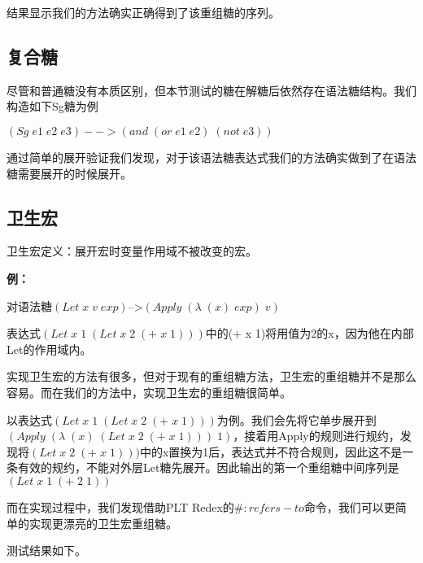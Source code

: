 结果显示我们的方法确实正确得到了该重组糖的序列。

\subsection{复合糖}

尽管和普通糖没有本质区别，但本节测试的糖在解糖后依然存在语法糖结构。我们构造如下Sg糖为例

$(Sg\;e1\;e2\;e3)-->(and\;(or\;e1\;e2)\;(not\;e3))$


通过简单的展开验证我们发现，对于该语法糖表达式我们的方法确实做到了在语法糖需要展开的时候展开。

\subsection{卫生宏}

卫生宏定义：展开宏时变量作用域不被改变的宏。

{\bfseries 例：}

对语法糖$(Let\;x\;v\;exp)$-->$(Apply\;(\lambda\;(x)\;exp)\;v)$

表达式$(Let\;x\;1\;(Let\;x\;2\;(+\;x\;1)))$中的(+ x 1)将用值为2的x，因为他在内部Let的作用域内。

实现卫生宏的方法有很多，但对于现有的重组糖方法，卫生宏的重组糖并不是那么容易。而在我们的方法中，实现卫生宏的重组糖很简单。

以表达式$(Let\;x\;1\;(Let\;x\;2\;(+\;x\;1)))$为例。我们会先将它单步展开到
$(Apply\;(\lambda\;(x)\;(Let\;x\;2\;(+\;x\;1)))\;1)$，接着用Apply的规则进行规约，发现将$(Let\;x\;2\;(+\;x\;1)))$中的x置换为1后，表达式并不符合规则，因此这不是一条有效的规约，不能对外层Let糖先展开。因此输出的第一个重组糖中间序列是$(Let\;x\;1\;(+\;2\;1))$

而在实现过程中，我们发现借助PLT Redex的$\#:refers-to$命令，我们可以更简单的实现更漂亮的卫生宏重组糖。

测试结果如下。

